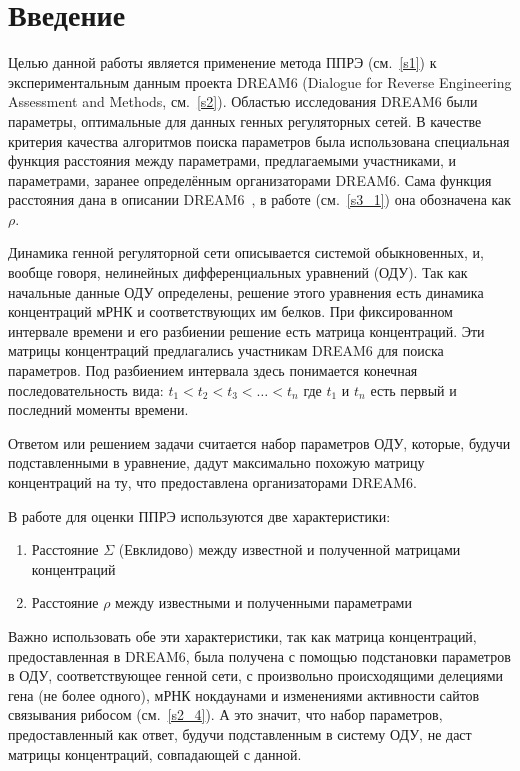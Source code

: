 \chapter*{Введение}							%

Целью данной работы является применение метода ППРЭ (см.~\ref{s1}) к 
экспериментальным данным проекта DREAM6 (Dialogue for Reverse Engineering 
Assessment and Methods, см.~\ref{s2}). Областью исследования DREAM6 были 
параметры, оптимальные для данных генных регуляторных сетей. В качестве критерия 
качества алгоритмов поиска параметров была использована специальная функция 
расстояния между параметрами, предлагаемыми участниками, и параметрами, заранее 
определённым организаторами DREAM6. 
Сама функция расстояния дана в описании DREAM6~\cite{bibDREAM}, 
в работе (см.~\ref{s3_1}) она обозначена как $\rho$.

Динамика генной регуляторной сети описывается системой обыкновенных, и, вообще 
говоря, нелинейных дифференциальных уравнений (ОДУ). Так как начальные данные 
ОДУ определены, решение этого уравнения есть динамика концентраций мРНК и 
соответствующих им белков. При фиксированном интервале времени и его разбиении 
решение есть матрица концентраций. Эти матрицы концентраций предлагались 
участникам DREAM6 для поиска параметров. Под разбиением интервала здесь 
понимается конечная последовательность вида: $t_1 < t_2 < t_3 < \dots < t_n$ 
где $t_1$ и $t_n$ есть первый и последний моменты времени.

Ответом или решением задачи считается набор параметров ОДУ, которые, будучи 
подставленными в уравнение, дадут максимально похожую матрицу концентраций на 
ту, что предоставлена организаторами DREAM6.

В работе для оценки ППРЭ используются две характеристики:
\begin{enumerate}
  \item Расстояние $\Sigma$ (Евклидово) между известной и полученной матрицами 
  концентраций
  \item Расстояние $\rho$ между известными и полученными параметрами
\end{enumerate}

Важно использовать обе эти характеристики, так как матрица концентраций, 
предоставленная в DREAM6, была получена с помощью подстановки параметров 
в ОДУ, соответствующее генной сети, с произвольно происходящими делециями гена
(не более одного), мРНК нокдаунами и изменениями активности сайтов связывания 
рибосом (см.~\ref{s2_4}). А это значит, что набор параметров, предоставленный 
как ответ, будучи подставленным в систему ОДУ, не даст матрицы концентраций, 
совпадающей с данной.

